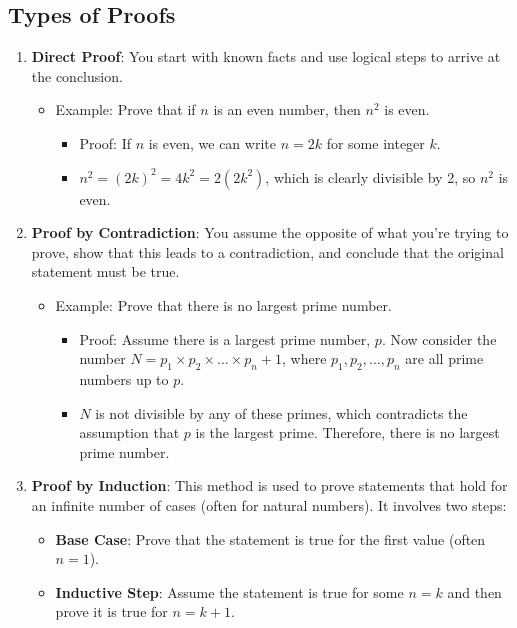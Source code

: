 \subsection{Types of Proofs}
\begin{enumerate}
    \item \textbf{Direct Proof}: You start with known facts and use logical steps to arrive at the conclusion.
    \begin{itemize}
        \item Example: Prove that if \( n \) is an even number, then \( n^2 \) is even.
        \begin{itemize}
            \item Proof: If \( n \) is even, we can write \( n = 2k \) for some integer \( k \).
            \item \( n^2 = (2k)^2 = 4k^2 = 2(2k^2) \), which is clearly divisible by 2, so \( n^2 \) is even.
        \end{itemize}
    \end{itemize}
    \item \textbf{Proof by Contradiction}: You assume the opposite of what you're trying to prove, show that this leads to a contradiction, and conclude that the original statement must be true.
    \begin{itemize}
        \item Example: Prove that there is no largest prime number.
        \begin{itemize}
            \item Proof: Assume there is a largest prime number, \( p \). Now consider the number \( N = p_1 \times p_2 \times \dots \times p_n + 1 \), where \( p_1, p_2, \dots, p_n \) are all prime numbers up to \( p \).
            \item \( N \) is not divisible by any of these primes, which contradicts the assumption that \( p \) is the largest prime. Therefore, there is no largest prime number.
        \end{itemize}
    \end{itemize}
    \item \textbf{Proof by Induction}: This method is used to prove statements that hold for an infinite number of cases (often for natural numbers). It involves two steps:
    \begin{itemize}
        \item \textbf{Base Case}: Prove that the statement is true for the first value (often \( n = 1 \)).
        \item \textbf{Inductive Step}: Assume the statement is true for some \( n = k \) and then prove it is true for \( n = k + 1 \).

\end{itemize}
\end{enumerate}
